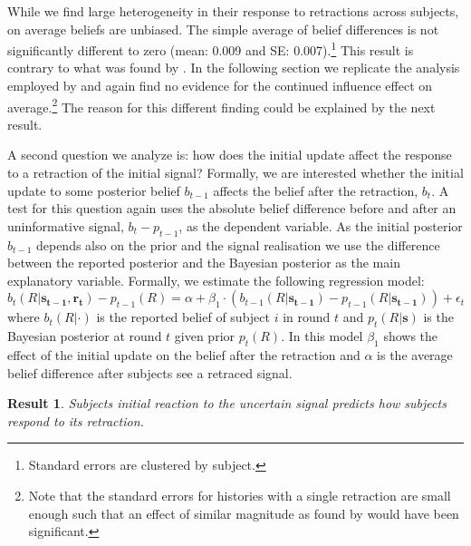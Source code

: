 \documentclass{article}
\newtheorem{result}{Result}
\newenvironment{Result}{\begin{result} \rm }{\end{result}}
\begin{document}
While we find large heterogeneity in their response to retractions across subjects, on average beliefs are unbiased. The simple average of belief differences is not significantly different to zero (mean: 0.009 and SE: 0.007).\footnote{Standard errors are clustered by subject.} This result is contrary to what was found by \cite{Goncalves2022}. In the following section we replicate the analysis employed by \cite{Goncalves2022} and again find no evidence for the continued influence effect on average.\footnote{Note that the standard errors for histories with a single retraction are small enough such that an effect of similar magnitude as found by \cite{Goncalves2022} would have been significant.} The reason for this different finding could be explained by the next result.

A second question we analyze is: how does the initial update affect the response to a retraction of the initial signal? Formally, we are interested whether the initial update to some posterior belief $b_{t-1}$ affects the belief after the retraction, $b_t$. A test for this question again uses the absolute belief difference before and after an uninformative signal, $b_t-p_{t-1}$, as the dependent variable. As the initial posterior $b_{t-1}$ depends also on the prior and the signal realisation we use the difference between the reported posterior and the Bayesian posterior as the main explanatory variable. Formally, we estimate the following regression model:
\begin{equation}
\label{reg:retraction_simple}
    b_t(R|\mathbf{s_{t-1}}, \mathbf{r_t})-p_{t-1}(R)=\alpha + \beta_1 \cdot (b_{t-1}(R|\mathbf{s_{t-1}})-p_{t-1}(R|\mathbf{s_{t-1}}))+\epsilon_t
\end{equation}
where $b_t(R|\cdot)$ is the reported belief of subject $i$ in round $t$ and $p_t(R|\mathbf{s})$ is the Bayesian posterior at round $t$ given prior $p_t(R)$. In this model $\beta_1$ shows the effect of the initial update on the belief after the retraction and $\alpha$ is the average belief difference after subjects see a retraced signal. 

\begin{Result}
\label{result_retraction_previous}
Subjects initial reaction to the uncertain signal predicts how subjects respond to its retraction.
\end{Result}
\end{document}
